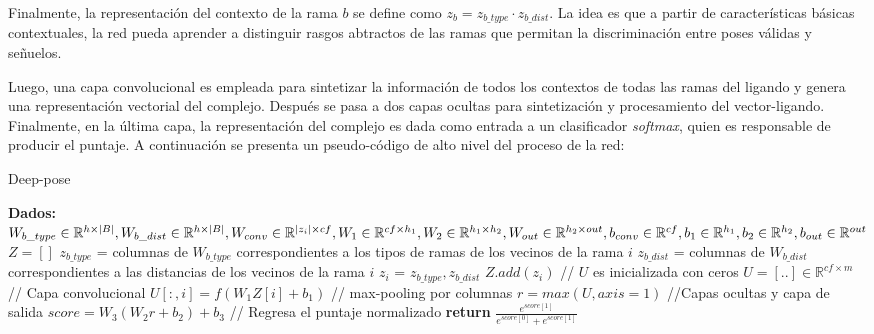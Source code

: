 Finalmente, la representación del contexto de la rama $b$ se define como
$z_b = z_{b\_type} \cdot z_{b\_dist}$. La idea es que a partir de características
básicas contextuales, la red pueda aprender a distinguir rasgos abtractos
de las ramas que permitan la discriminación entre poses válidas y señuelos.

Luego, una capa convolucional es empleada para sintetizar la
información de todos los contextos de todas las ramas del ligando y
genera una representación vectorial del complejo. Después se pasa a
dos capas ocultas para sintetización y procesamiento del
vector-ligando. Finalmente, en la última capa, la representación del
complejo es dada como entrada a un clasificador \textit{softmax},
quien es responsable de producir el puntaje. A continuación se
presenta un pseudo-código de alto nivel del proceso de la red:
\begin{algorithm}
  \caption{Deep-pose}
  \begin{algorithmic}[1]
    \State \textbf{Dados:}\newline
                           $W_{b\_type} \in \mathbb{R}^{h\times |B|}, W_{b\_dist}
                           \in \mathbb{R}^{h\times |B|},\newline
                           W_{conv} \in \mathbb{R}^{|z_i| \times cf}, W_1 \in
                           \mathbb{R}^{cf \times h_1},\newline
                           W_2 \in \mathbb{R}^{h_1 \times h_2}, W_{out} \in
                           \mathbb{R}^{h_2 \times out},\newline
                           b_{conv} \in \mathbb{R}^{cf}, b_{1} \in
                           \mathbb{R}^{h_1},\newline
                           b_{2} \in \mathbb{R}^{h_2}, b_{out}
                           \in \mathbb{R}^{out}$
    \State $Z = []$
      \State $z_{b\_type}$ = columnas de $W_{b\_type}$
      correspondientes a los tipos de ramas de los vecinos de la
      rama $i$
      \State $z_{b\_dist}$ = columnas de $W_{b\_dist}$
      correspondientes a las distancias de los vecinos de la rama $i$
      \State $z_i$ = {$z_{b\_type}, z_{b\_dist}$}
      \State $Z.add(z_i)$
    \EndFor
    \State // $U$ es inicializada con ceros
    \State $U = [..] \in \mathbb{R}^{cf \times m}$
    \State // Capa convolucional
      \State $U[:,i]=f(W_1Z[i] + b_1)$
    \EndFor
    \State // max-pooling por columnas
    \State $r=max(U, axis=1)$
    \State //Capas ocultas y capa de salida
    \State $score=W_3(W_2r + b_2) + b_3$
    \State // Regresa el puntaje normalizado
    \State \textbf{return} $\frac{e^{score[1]}}{e^{score[0]}+e^{score[1]}}$
  \end{algorithmic}
\end{algorithm}
